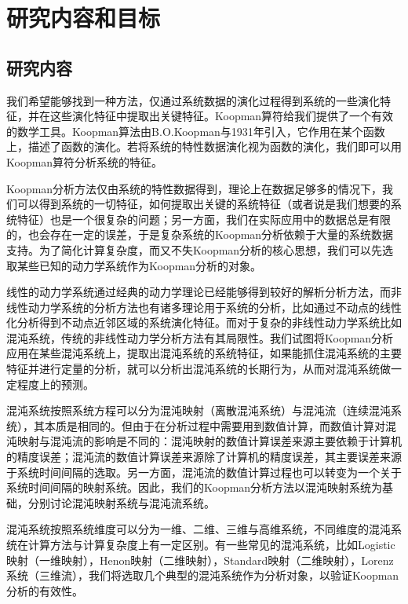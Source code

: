 \section{研究内容和目标}
\subsection{研究内容}
我们希望能够找到一种方法，仅通过系统数据的演化过程得到系统的一些演化特征，并在这些演化特征中提取出关键特征。Koopman算符给我们提供了一个有效的数学工具。Koopman算法由B.O.Koopman与1931年引入，它作用在某个函数上，描述了函数的演化。若将系统的特性数据演化视为函数的演化，我们即可以用Koopman算符分析系统的特征。

Koopman分析方法仅由系统的特性数据得到，理论上在数据足够多的情况下，我们可以得到系统的一切特征，如何提取出关键的系统特征（或者说是我们想要的系统特征）也是一个很复杂的问题；另一方面，我们在实际应用中的数据总是有限的，也会存在一定的误差，于是复杂系统的Koopman分析依赖于大量的系统数据支持。为了简化计算复杂度，而又不失Koopman分析的核心思想，我们可以先选取某些已知的动力学系统作为Koopman分析的对象。

线性的动力学系统通过经典的动力学理论已经能够得到较好的解析分析方法，而非线性动力学系统的分析方法也有诸多理论用于系统的分析，比如通过不动点的线性化分析得到不动点近邻区域的系统演化特征。而对于复杂的非线性动力学系统比如混沌系统，传统的非线性动力学分析方法有其局限性。我们试图将Koopman分析应用在某些混沌系统上，提取出混沌系统的系统特征，如果能抓住混沌系统的主要特征并进行定量的分析，就可以分析出混沌系统的长期行为，从而对混沌系统做一定程度上的预测。

混沌系统按照系统方程可以分为混沌映射（离散混沌系统）与混沌流（连续混沌系统），其本质是相同的。但由于在分析过程中需要用到数值计算，而数值计算对混沌映射与混沌流的影响是不同的：混沌映射的数值计算误差来源主要依赖于计算机的精度误差；混沌流的数值计算误差来源除了计算机的精度误差，其主要误差来源于系统时间间隔的选取。另一方面，混沌流的数值计算过程也可以转变为一个关于系统时间间隔的映射系统。因此，我们的Koopman分析方法以混沌映射系统为基础，分别讨论混沌映射系统与混沌流系统。

混沌系统按照系统维度可以分为一维、二维、三维与高维系统，不同维度的混沌系统在计算方法与计算复杂度上有一定区别。有一些常见的混沌系统，比如Logistic映射（一维映射），Henon映射（二维映射），Standard映射（二维映射），Lorenz系统（三维流），我们将选取几个典型的混沌系统作为分析对象，以验证Koopman分析的有效性。


